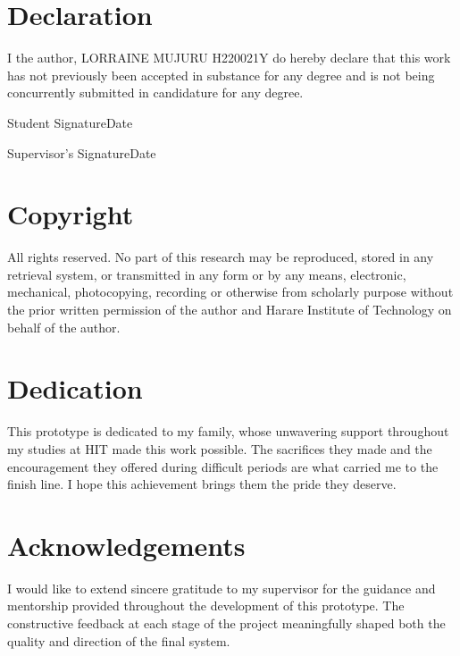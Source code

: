 \documentclass[12pt,a4paper]{report}
\begin{document}
\chapter*{Declaration}

I the author, LORRAINE MUJURU H220021Y do hereby declare that this work has not
previously been accepted in substance for any degree and is not being concurrently
submitted in candidature for any degree.

\vspace{3cm}
Student Signature\dotfill Date\dotfill

\vspace{2.5cm}
Supervisor's Signature\dotfill Date\dotfill
\newpage

\chapter*{Copyright}

All rights reserved. No part of this research may be reproduced, stored in any
retrieval system, or transmitted in any form or by any means, electronic, mechanical,
photocopying, recording or otherwise from scholarly purpose without the prior written
permission of the author and Harare Institute of Technology on behalf of the author.
\newpage

\chapter*{Dedication}

This prototype is dedicated to my family, whose unwavering support throughout my
studies at HIT made this work possible. The sacrifices they made and the encouragement
they offered during difficult periods are what carried me to the finish line. I hope this
achievement brings them the pride they deserve.
\newpage

\chapter*{Acknowledgements}

I would like to extend sincere gratitude to my supervisor for the guidance and mentorship
provided throughout the development of this prototype. The constructive feedback at each
stage of the project meaningfully shaped both the quality and direction of the final system.
\end{document}
